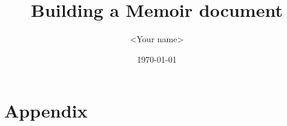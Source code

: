 \documentclass[english, oneside, 12pt]{memoir}
\title{Building a Memoir document}
\author{<Your name>}
\date{\today}
\begin{document}
\maketitle



\newpage
\begin{KeepFromToc}
	\tableofcontents 	%
\end{KeepFromToc}



\newpage
\appendix

\chapter{Appendix}




\end{document}
